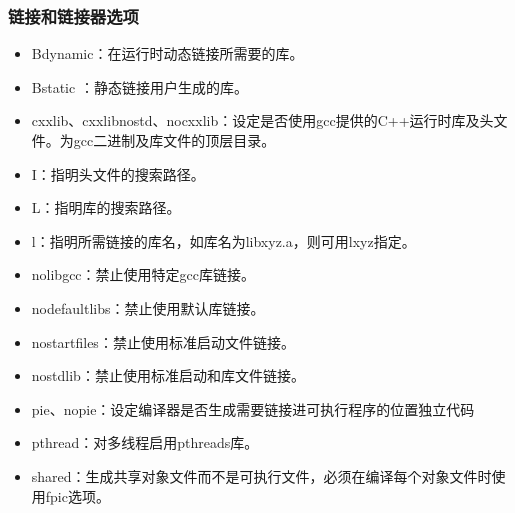 \documentclass[a4paper,12pt,english]{sphinxmanual}
\begin{document}
\subsubsection{链接和链接器选项}
\label{\detokenize{compiler/intel:id14}}\begin{itemize}
\item {} 
\sphinxAtStartPar
\sphinxhyphen{}Bdynamic：在运行时动态链接所需要的库。

\item {} 
\sphinxAtStartPar
\sphinxhyphen{}Bstatic ：静态链接用户生成的库。

\item {} 
\sphinxAtStartPar
\sphinxhyphen{}cxxlib\sphinxstyleemphasis{{[}=dir{]}}、\sphinxhyphen{}cxxlib\sphinxhyphen{}nostd、\sphinxhyphen{}no\sphinxhyphen{}cxxlib：设定是否使用gcc提供的C++运行时库及头文件。为gcc二进制及库文件的顶层目录。

\item {} 
\sphinxAtStartPar
\sphinxhyphen{}I：指明头文件的搜索路径。

\item {} 
\sphinxAtStartPar
\sphinxhyphen{}L：指明库的搜索路径。

\item {} 
\sphinxAtStartPar
\sphinxhyphen{}l：指明所需链接的库名，如库名为libxyz.a，则可用\sphinxhyphen{}lxyz指定。

\item {} 
\sphinxAtStartPar
\sphinxhyphen{}no\sphinxhyphen{}libgcc：禁止使用特定gcc库链接。

\item {} 
\sphinxAtStartPar
\sphinxhyphen{}nodefaultlibs：禁止使用默认库链接。

\item {} 
\sphinxAtStartPar
\sphinxhyphen{}nostartfiles：禁止使用标准启动文件链接。

\item {} 
\sphinxAtStartPar
\sphinxhyphen{}nostdlib：禁止使用标准启动和库文件链接。

\item {} 
\sphinxAtStartPar
\sphinxhyphen{}pie、\sphinxhyphen{}no\sphinxhyphen{}pie：设定编译器是否生成需要链接进可执行程序的位置独立代码

\item {} 
\sphinxAtStartPar
\sphinxhyphen{}pthread：对多线程启用pthreads库。

\item {} 
\sphinxAtStartPar
\sphinxhyphen{}shared：生成共享对象文件而不是可执行文件，必须在编译每个对象文件时使用\sphinxhyphen{}fpic选项。


\end{itemize}
\end{document}
